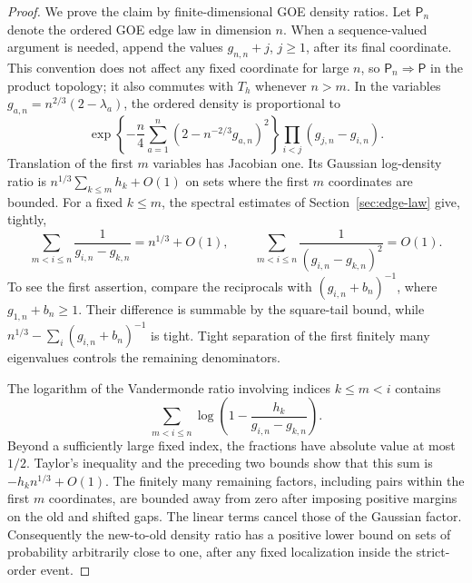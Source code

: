 \begin{proof}
We prove the claim by finite-dimensional GOE density ratios.  Let
$\mathsf P_n$ denote the ordered GOE edge law in dimension $n$.
When a sequence-valued argument is needed, append the values
$g_{n,n}+j$, $j\geq1$, after its final coordinate.  This convention
does not affect any fixed coordinate for large $n$, so
$\mathsf P_n\Longrightarrow\mathsf P$ in the product topology; it
also commutes with $T_h$ whenever $n>m$.
In the
variables $g_{a,n}=n^{2/3}(2-\lambda_a)$, the ordered density is
proportional to
\[
 \exp\left\{-\frac n4\sum_{a=1}^n
                 (2-n^{-2/3}g_{a,n})^2\right\}
 \prod_{i<j}(g_{j,n}-g_{i,n}).
\]
Translation of the first $m$ variables has Jacobian one.  Its Gaussian
log-density ratio is
$n^{1/3}\sum_{k\leq m}h_k+O(1)$ on sets where the first $m$
coordinates are bounded.  For a fixed $k\leq m$, the spectral estimates
of Section~\ref{sec:edge-law} give, tightly,
\[
 \sum_{m<i\leq n}\frac1{g_{i,n}-g_{k,n}}=n^{1/3}+O(1),
 \qquad
 \sum_{m<i\leq n}\frac1{(g_{i,n}-g_{k,n})^2}=O(1).
\]
To see the first assertion, compare the reciprocals with
$(g_{i,n}+b_n)^{-1}$, where $g_{1,n}+b_n\geq1$.
Their difference is summable by the square-tail bound, while
$n^{1/3}-\sum_i(g_{i,n}+b_n)^{-1}$ is tight.  Tight separation of
the first finitely many eigenvalues controls the remaining denominators.

The logarithm of the Vandermonde ratio involving indices $k\leq m<i$
contains
\[
 \sum_{m<i\leq n}\log\left(1-\frac{h_k}{g_{i,n}-g_{k,n}}\right).
\]
Beyond a sufficiently large fixed index, the fractions have absolute
value at most $1/2$.  Taylor's inequality and the preceding two bounds
show that this sum is $-h_kn^{1/3}+O(1)$.  The finitely many remaining
factors, including pairs within the first $m$ coordinates, are bounded
away from zero after imposing positive margins on the old and shifted
gaps.  The linear terms cancel those of the Gaussian factor.
Consequently the new-to-old density ratio has a positive lower bound
on sets of probability arbitrarily close to one, after any fixed
localization inside the strict-order event.


\end{proof}
